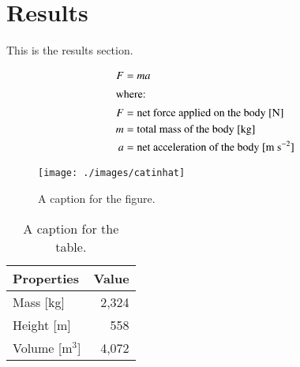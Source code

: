 \section{Results}

This is the results section.

\begin{align}
	F &= ma \\
	\intertext{where:}
	F &= \text{net force applied on the body [N]} \nonumber \\
	m &= \text{total mass of the body [kg]} \nonumber \\
	a &= \text{net acceleration of the body [m s}^{-2}\text{]} \nonumber
\end{align}

\begin{figure}[htbp!]
	\begin{center}
		\texttt{[image: ./images/catinhat]}
	\end{center}
	\caption{A caption for the figure.}
	\label{fig:catinhat}
\end{figure}

\begin{table}[h]
	\centering
        \caption{A caption for the table.}
\begin{tabular}{lr}
	\hline
	\textbf{Properties} & \textbf{Value} \\
	\hline
    Mass [kg] & 2,324 \\
    Height [m] & 558 \\
    Volume [m$^3$] & 4,072 \\
    \hline
\end{tabular}
\label{tab:table1}
\end {table}
